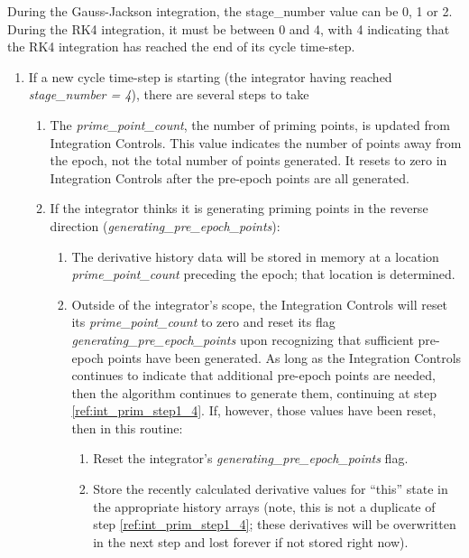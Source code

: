 During the Gauss-Jackson integration, the stage\_number value can be 0,
1 or 2. During the RK4 integration, it must be between 0 and 4, with
4 indicating that the RK4 integration has reached the end of its cycle
time-step.

\begin{enumerate}
\item If a new cycle time-step is starting (the integrator having
reached \newline \textit{stage\_number = 4}), there are several steps to take

\begin{enumerate}
\item The \textit{prime\_point\_count}, the number of priming points, is
updated from Integration Controls. This value indicates the number of
points away from the epoch, not the total number of points generated.
It resets to zero in Integration Controls after the pre-epoch points are all
generated.
\item If the integrator thinks it is generating priming points in the
reverse direction (\textit{generating\_pre\_epoch\_points}):

\begin{enumerate}
\item The derivative history data will be stored in memory at a location
\textit{prime\_point\_count }preceding the epoch; that location is determined.

\item Outside of the integrator's scope, the Integration Controls
will reset its \textit{prime\_point\_count} to zero and reset its flag 
\textit{generating\_pre\_epoch\_points} upon recognizing that 
sufficient pre-epoch points have been generated. 
As long as the Integration Controls continues to indicate that additional
pre-epoch points are needed, then the algorithm continues to generate
them, continuing at step \ref{ref:int_prim_step1_4}.
If, however, those values have been reset, then in this routine:

\begin{enumerate}
\item Reset the integrator's
\textit{generating\_pre\_epoch\_points }flag.

\item Store the recently calculated derivative values for
{\textquotedblleft}this{\textquotedblright} state in the appropriate
history arrays (note, this is not a duplicate of step 
\ref{ref:int_prim_step1_4};
these derivatives will be overwritten in the next step and lost forever
if not stored right now).


\end{enumerate}
\end{enumerate}
\end{enumerate}
\end{enumerate}

